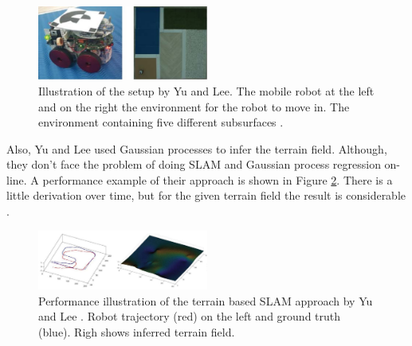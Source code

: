 \begin{figure}[h!]
	\centering
	\includegraphics[width=0.5\textwidth]{images/yu_setup.png}
	\caption{
        Illustration of the setup by Yu and Lee. The mobile robot at the left and
        on the right the environment for the robot to move in. The environment containing
        five different subsurfaces \cite{yu_terrain_2018}.
        }
	\label{fig:yu_setup}
\end{figure}

Also, Yu and Lee used Gaussian processes to infer the terrain field. Although, they don't face the
problem of doing SLAM and Gaussian process regression on-line. A performance example of their approach
is shown in Figure \ref{fig:yu_performance}. There is a little derivation over time, but
for the given terrain field the result is considerable \cite{yu_terrain_2018}.

\begin{figure}[h!]
	\centering
	\includegraphics[width=0.5\textwidth]{images/yu_performance.png}
	\caption{
        Performance illustration of the terrain based SLAM approach by Yu and Lee \cite{yu_terrain_2018}.
        Robot trajectory (red) on the left and ground truth (blue). Righ shows inferred terrain field.
        }
	\label{fig:yu_performance}
\end{figure}

